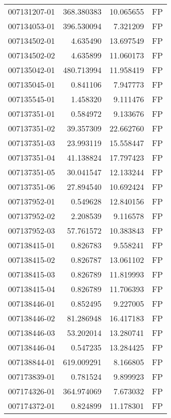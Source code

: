 \begin{tabular}{lrrl}
007131207-01 &  368.380383 &      10.065655 &   FP \\
007134053-01 &  396.530094 &       7.321209 &   FP \\
007134502-01 &    4.635490 &      13.697549 &   FP \\
007134502-02 &    4.635899 &      11.060173 &   FP \\
007135042-01 &  480.713994 &      11.958419 &   FP \\
007135045-01 &    0.841106 &       7.947773 &   FP \\
007135545-01 &    1.458320 &       9.111476 &   FP \\
007137351-01 &    0.584972 &       9.133676 &   FP \\
007137351-02 &   39.357309 &      22.662760 &   FP \\
007137351-03 &   23.993119 &      15.558447 &   FP \\
007137351-04 &   41.138824 &      17.797423 &   FP \\
007137351-05 &   30.041547 &      12.133244 &   FP \\
007137351-06 &   27.894540 &      10.692424 &   FP \\
007137952-01 &    0.549628 &      12.840156 &   FP \\
007137952-02 &    2.208539 &       9.116578 &   FP \\
007137952-03 &   57.761572 &      10.383843 &   FP \\
007138415-01 &    0.826783 &       9.558241 &   FP \\
007138415-02 &    0.826787 &      13.061102 &   FP \\
007138415-03 &    0.826789 &      11.819993 &   FP \\
007138415-04 &    0.826789 &      11.706393 &   FP \\
007138446-01 &    0.852495 &       9.227005 &   FP \\
007138446-02 &   81.286948 &      16.417183 &   FP \\
007138446-03 &   53.202014 &      13.280741 &   FP \\
007138446-04 &    0.547235 &      13.284425 &   FP \\
007138844-01 &  619.009291 &       8.166805 &   FP \\
007173839-01 &    0.781524 &       9.899923 &   FP \\
007174326-01 &  364.974069 &       7.673032 &   FP \\
007174372-01 &    0.824899 &      11.178301 &   FP \\

\end{tabular}
